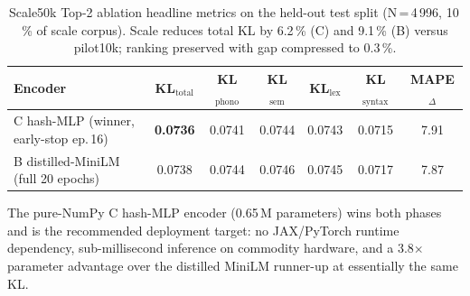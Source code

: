 \begin{table}[t]
  \centering
  \begin{tabular}{lcccccc}
    \toprule
    Encoder & KL\(_{\mathrm{total}}\) & KL\(_{\mathrm{phono}}\) & KL\(_{\mathrm{sem}}\) & KL\(_{\mathrm{lex}}\) & KL\(_{\mathrm{syntax}}\) & MAPE\(_{\Delta}\) \\
    \midrule
    C hash-MLP (winner, early-stop ep.\,16)   & \textbf{0.0736} & 0.0741 & 0.0744 & 0.0743 & 0.0715 & 7.91 \\
    B distilled-MiniLM (full 20 epochs)        & 0.0738 & 0.0744 & 0.0746 & 0.0745 & 0.0717 & 7.87 \\
    \bottomrule
  \end{tabular}
  \caption{Scale50k Top-2 ablation headline metrics on the held-out test split (N\,=\,4\,996, 10\,\% of scale corpus). Scale reduces total KL by 6.2\,\% (C) and 9.1\,\% (B) versus pilot10k; ranking preserved with gap compressed to 0.3\,\%.}
  \label{tab:scale}
\end{table}

The pure-NumPy C hash-MLP encoder (0.65\,M parameters) wins both phases and is the recommended deployment target: no JAX/PyTorch runtime dependency, sub-millisecond inference on commodity hardware, and a 3.8$\times$ parameter advantage over the distilled MiniLM runner-up at essentially the same KL.
